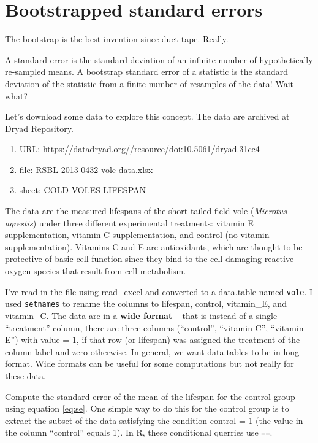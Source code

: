 \documentclass[]{book}
\providecommand{\tightlist}{%
  \setlength{\itemsep}{0pt}\setlength{\parskip}{0pt}}
\begin{document}
\section{Bootstrapped standard
errors}\label{bootstrapped-standard-errors}

The bootstrap is the best invention since duct tape. Really.

A standard error is the standard deviation of an infinite number of
hypothetically re-sampled means. A bootstrap standard error of a
statistic is the standard deviation of the statistic from a finite
number of resamples of the data! Wait what?

Let's download some data to explore this concept. The data are archived
at Dryad Repository.

\begin{enumerate}
\def\labelenumi{\arabic{enumi}.}
\tightlist
\item
  URL: \url{https://datadryad.org//resource/doi:10.5061/dryad.31cc4}
\item
  file: RSBL-2013-0432 vole data.xlsx
\item
  sheet: COLD VOLES LIFESPAN
\end{enumerate}

The data are the measured lifespans of the short-tailed field vole
(\emph{Microtus agrestis}) under three different experimental
treatments: vitamin E supplementation, vitamin C supplementation, and
control (no vitamin supplementation). Vitamins C and E are antioxidants,
which are thought to be protective of basic cell function since they
bind to the cell-damaging reactive oxygen species that result from cell
metabolism.

I've read in the file using read\_excel and converted to a data.table
named \texttt{vole}. I used \texttt{setnames} to rename the columns to
lifespan, control, vitamin\_E, and vitamin\_C. The data are in a
\textbf{wide format} -- that is instead of a single ``treatment''
column, there are three columns (``control'', ``vitamin C'', ``vitamin
E'') with value = 1, if that row (or lifespan) was assigned the
treatment of the column label and zero otherwise. In general, we want
data.tables to be in long format. Wide formats can be useful for some
computations but not really for these data.

Compute the standard error of the mean of the lifespan for the control
group using equation \eqref{eq:se}. One simple way to do this for the
control group is to extract the subset of the data satisfying the
condition control = 1 (the value in the column ``control'' equals 1). In
R, these conditional querries use \texttt{==}.
\end{document}
